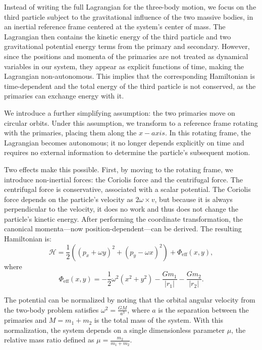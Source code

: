         Instead of writing the full Lagrangian for the three-body motion, we focus on the third particle subject to the gravitational influence of the two massive bodies, in an inertial reference frame centered at the system's center of mass. The Lagrangian then contains the kinetic energy of the third particle and two gravitational potential energy terms from the primary and secondary. However, since the positions and momenta of the primaries are not treated as dynamical variables in our system, they appear as explicit functions of time, making the Lagrangian non-autonomous. This implies that the corresponding Hamiltonian is time-dependent and the total energy of the third particle is not conserved, as the primaries can exchange energy with it.

        We introduce a further simplifying assumption: the two primaries move on circular orbits. Under this assumption, we transform to a reference frame rotating with the primaries, placing them along the $x-axis$. In this rotating frame, the Lagrangian becomes autonomous; it no longer depends explicitly on time and requires no external information to determine the particle's subsequent motion.

        Two effects make this possible. First, by moving to the rotating frame, we introduce non-inertial forces: the Coriolis force and the centrifugal force. The centrifugal force is conservative, associated with a scalar potential. The Coriolis force depends on the particle's velocity as $2\omega\times v$, but because it is always perpendicular to the velocity, it does no work and thus does not change the particle's kinetic energy. After performing the coordinate transformation, the canonical momenta—now position-dependent—can be derived. The resulting Hamiltonian is:
        \begin{equation}
            \mathcal{H} = \frac{1}{2}\left(\left(p_x + \omega y\right)^2 + \left(p_y - \omega x\right)^2 \right) + \Phi_\mathrm{eff}(x,y),
        \end{equation}
        where
        \begin{equation}
            \Phi_\mathrm{eff}(x,y) = -\frac{1}{2} \omega^2 (x^2 + y^2) - \frac{G m_1}{|r_1|} - \frac{G m_2}{|r_2|}.
        \end{equation}

        The potential can be normalized by noting that the orbital angular velocity from the two-body problem satisfies \(\omega^2 = \frac{G M}{a^3}\), where \(a\) is the separation between the primaries and \(M = m_1 + m_2\) is the total mass of the system. With this normalization, the system depends on a single dimensionless parameter \(\mu\), the relative mass ratio defined as \(\mu = \frac{m_2}{m_1 + m_2}\).

